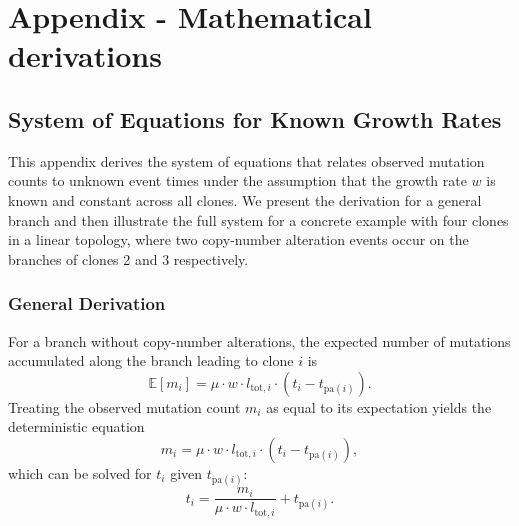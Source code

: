 \chapter{Appendix - Mathematical derivations}


\section{System of Equations for Known Growth Rates}
\label{app:KNWNO W}

This appendix derives the system of equations that relates observed mutation counts 
to unknown event times under the assumption that the growth rate $w$ is known and 
constant across all clones. We present the derivation for a general branch and then
illustrate the full system for a concrete example with four clones in a linear 
topology, where two copy-number alteration events occur on the branches of clones 
2 and 3 respectively.

\subsection*{General Derivation}

For a branch without copy-number alterations, the expected number of mutations 
accumulated along the branch leading to clone $i$ is
%
\begin{equation}
    \mathbb{E}[m_i] = \mu \cdot w \cdot l_{\mathrm{tot},i} \cdot (t_i - t_{\mathrm{pa}(i)}).
\end{equation}
%
Treating the observed mutation count $m_i$ as equal to its expectation yields the 
deterministic equation
%
\begin{equation}
    m_i = \mu \cdot w \cdot l_{\mathrm{tot},i} \cdot (t_i - t_{\mathrm{pa}(i)}),
\end{equation}
%
which can be solved for $t_i$ given $t_{\mathrm{pa}(i)}$:
%
\begin{equation}
    t_i = \frac{m_i}{\mu \cdot w \cdot l_{\mathrm{tot},i}} + t_{\mathrm{pa}(i)}.
\end{equation}

